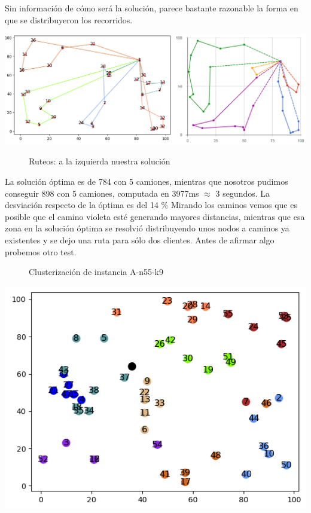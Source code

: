 \documentclass[11pt,a4paper]{article}
\begin{document}
Sin información de cómo será la solución, parece bastante razonable la forma en que se distribuyeron los recorridos. 

\includegraphics[scale=.5]{graficos/A-n32-k5/caminos.png}

\begin{figure}[!h]
\caption{Ruteos: a la izquierda nuestra solución}
\end{figure}
La solución óptima es de 784 con 5 camiones, mientras que nosotros pudimos conseguir 898 con 5 camiones, computada en 3977ms $\approx$ 3 segundos. La desviación respecto de la óptima es del 14 \% Mirando los caminos vemos que es posible que el camino violeta esté generando mayores distancias, mientras que esa zona en la solución óptima se resolvió distribuyendo unos nodos a caminos ya existentes y se dejo una ruta para sólo dos clientes. Antes de afirmar algo probemos otro test.
\bigskip


\begin{figure}[!h]
\caption{Clusterización de instancia A-n55-k9}
\end{figure}

\includegraphics[scale=.5]{graficos/A-n55-k9/cluster.png}
\bigskip
\end{document}
